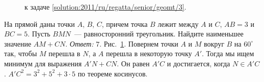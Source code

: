\ifsolution
\begin{figure}\centering
    \caption{к задаче \ref{solution:2011/ru/regatta/senior/geomt/3}.}
    \label{fig:solution:2011/ru/regatta/senior/geomt/3}
\end{figure}
\fi %

\problem
На прямой даны точки $A$, $B$, $C$, причем точка $B$ лежит между $A$ и $C$, $AB = 3$ и $BC = 5$.
Пусть $BMN$~--- равносторонний треугольник.
Найдите наименьшее значение $AM + CN$.
\solution
\label{solution:2011/ru/regatta/senior/geomt/3}%
\emph{Ответ:} $7$.
Рис.~\ref{fig:solution:2011/ru/regatta/senior/geomt/3}.
Повернем точки $A$ и $M$ вокруг $B$ на $60^\circ$ так, чтобы $M$ перешла в $N$,
а $A$ перешла в некоторую точку $A'$.
Тогда мы ищем минимум для выражения $A'N + CN$.
Он равен $A'C$ и достигается, когда $N \in A'C$.
$A'C^2 = 3^2 + 5^2 + 3 \cdot 5$ по теореме косинусов.
\endproblem
